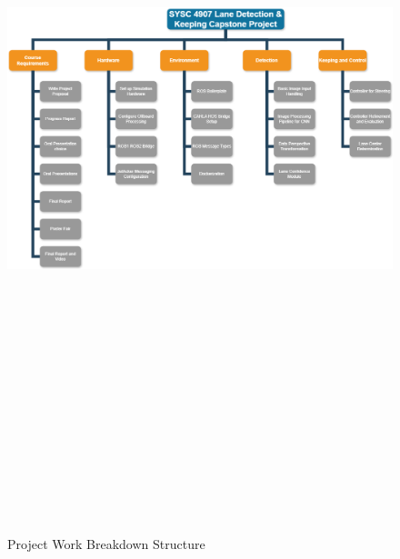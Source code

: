 \documentclass[titlepage, draft]{article}
\begin{document}
\begin{figure}[H]
	\centering
	\includegraphics[angle=90,height=9in]{wbs}
	\caption{Project Work Breakdown Structure}
	\label{fig:wbs}
\end{figure}
\end{document}
